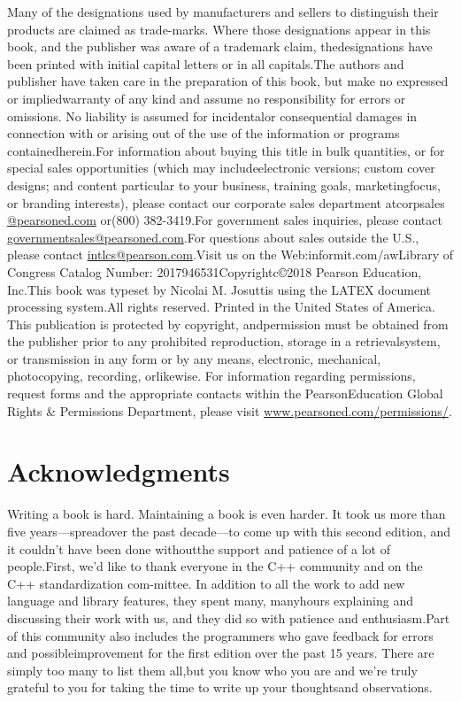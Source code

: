 \documentclass{book}
\begin{document}
	Many of the designations used by manufacturers and sellers to distinguish 
	their products are claimed as trade-marks.  Where those designations 
	appear in this book, and the publisher was aware of a trademark claim, 
	thedesignations have been printed with initial capital letters or in all 
	capitals.The authors and publisher have taken care in the preparation of 
	this book, but make no expressed or impliedwarranty of any kind and assume 
	no responsibility for errors or omissions. No liability is assumed for 
	incidentalor consequential damages in connection with or arising out of 
	the use of the information or programs containedherein.For information 
	about buying this title in bulk quantities, or for special sales 
	opportunities (which may includeelectronic versions;  custom cover 
	designs;  and content particular to your business, training goals, 
	marketingfocus, or branding interests), please contact our corporate sales 
	department atcorpsales \url{@pearsoned.com} or(800) 382-3419.For 
	government sales inquiries, please contact 
	\url{governmentsales@pearsoned.com}.For questions about sales outside the 
	U.S., please contact \url{intlcs@pearson.com}.Visit us on the 
	Web:informit.com/awLibrary of Congress Catalog Number: 
	2017946531Copyrightc©2018 Pearson Education, Inc.This book was typeset by 
	Nicolai M. Josuttis using the LATEX document processing system.All rights 
	reserved.  Printed in the United States of America.  This publication is 
	protected by copyright, andpermission  must  be  obtained  from  the  
	publisher  prior  to  any  prohibited  reproduction,  storage  in  a  
	retrievalsystem,  or  transmission  in  any  form  or  by  any  means,  
	electronic,  mechanical,  photocopying,  recording,  orlikewise. For 
	information regarding permissions, request forms and the appropriate 
	contacts within the PearsonEducation Global Rights \& Permissions 
	Department, please visit \url{www.pearsoned.com/permissions/}.
	
	\clearpage
	\newpage	
	\tableofcontents	
	\clearpage
	\newpage
	
	\section*{Acknowledgments}
	Writing a book is hard.  Maintaining a book is even harder.  It took us 
	more than five years—spreadover the past decade—to come up with this 
	second edition, and it couldn’t have been done withoutthe support and 
	patience of a lot of people.First, we’d like to thank everyone in the C++ 
	community and on the C++ standardization com-mittee.  In addition to all 
	the work to add new language and library features, they spent many, 
	manyhours explaining and discussing their work with us, and they did so 
	with patience and enthusiasm.Part of this community also includes the 
	programmers who gave feedback for errors and possibleimprovement for the 
	first edition over the past 15 years.  There are simply too many to list 
	them all,but you know who you are and we’re truly grateful to you for 
	taking the time to write up your thoughtsand observations.
	 
\end{document}
